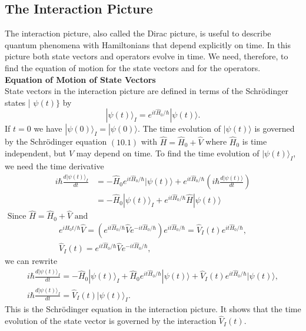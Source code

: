 \subsection{The Interaction Picture}
The interaction picture, also called the Dirac picture, is useful to describe quantum phenomena with Hamiltonians that depend explicitly on time. In this picture both state vectors and operators evolve in time. We need, therefore, to find the equation of motion for the state vectors and for the operators.\\
\textbf{Equation of Motion of State Vectors}\\
State vectors in the interaction picture are defined in terms of the Schrödinger states | $\psi(t)\}$ by
$$
|\psi(t)\rangle_{I}=e^{i t \hat{H}_{0} / \hbar}|\psi(t)\rangle .
$$
If $t=0$ we have $|\psi(0)\rangle_{I}=|\psi(0)\rangle$. The time evolution of $|\psi(t)\rangle$ is governed by the Schrödinger equation $(10.1)$ with $\hat{H}=\hat{H}_{0}+\hat{V}$ where $\hat{H}_{0}$ is time independent, but $\hat{V}$ may depend on time.
To find the time evolution of $|\psi(t)\rangle_{I}$, we need the time derivative 
$$
\begin{aligned}
i \hbar \frac{d|\psi(t)\rangle_{I}}{d t} &=-\hat{H}_{0} e^{i t \hat{H}_{0} / \hbar}|\psi(t)\rangle+e^{i t \hat{H}_{0} / \hbar}\left(i \hbar \frac{d|\psi(t)\rangle}{d t}\right) \\
&=-\hat{H}_{0}|\psi(t)\rangle_{I}+e^{i t \hat{H}_{0} / \hbar} \hat{H}|\psi(t)\rangle
\end{aligned}
$$
$\text { Since } \hat{H}=\hat{H}_{0}+\hat{V} \text { and }$
$$\begin{gathered}
e^{i H_{0} t / \hbar} \hat{V}=\left(e^{i t \hat{H}_{0} / \hbar} \hat{V} e^{-i t \hat{H}_{0} / \hbar}\right) e^{i t \hat{H}_{0} / \hbar}=\hat{V}_{I}(t) e^{i t \hat{H}_{0} / \hbar}, \\
\hat{V}_{I}(t)=e^{i t \hat{H}_{0} / \hbar} \hat{V} e^{-i t \hat{H}_{0} / \hbar},
\end{gathered}$$
we can rewrite\\
$$\begin{gathered}
i \hbar \frac{d|\psi(t)\rangle_{I}}{d t}=-\hat{H}_{0}|\psi(t)\rangle_{I}+\hat{H}_{0} e^{i t \hat{H}_{0} / \hbar}|\psi(t)\rangle+\hat{V}_{I}(t) e^{i t \hat{H}_{0} / \hbar}|\psi(t)\rangle, \\
i \hbar \frac{d|\psi(t)\rangle_{I}}{d t}=\hat{V}_{I}(t)|\psi(t)\rangle_{I} .
\end{gathered}$$
This is the Schrödinger equation in the interaction picture. It shows that the time evolution of the state vector is governed by the interaction $\hat{V}_{I}(t)$.\\
